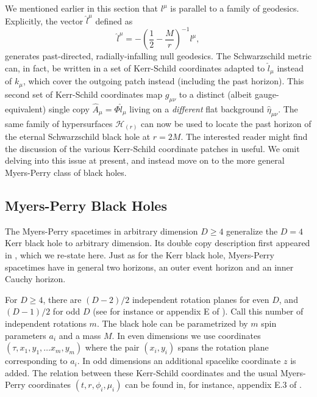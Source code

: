 We mentioned earlier in this section that $l^{\mu}$ is parallel to a family of geodesics. Explicitly, the vector
$\hat{l}^{\mu}$ defined as
\begin{equation}  
    \hat{l}^{\mu} = -\left( \frac{1}{2} - \frac{M}{r}\right)^{-1} l^{\mu},
\end{equation}
generates past-directed, radially-infalling null geodesics. The Schwarzschild metric can, in fact, be written in a
set of Kerr-Schild coordinates adapted to $\hat{l}_{\mu}$ instead of $k_{\mu}$, which cover the outgoing patch
instead (including the past horizon). This second set of Kerr-Schild coordinates map $g_{\mu \nu}$ to a distinct (albeit gauge-equivalent) single copy $\hat{A}_{\mu} = \Phi
\hat{l}_{\mu}$ living on a \emph{different} flat
background $\hat{\eta}_{\mu \nu}$. The same family of hypersurfaces $\mathcal{H}_{(r)}$ can now be used to locate
the past horizon of the eternal Schwarzschild black hole at $r = 2M$. The interested reader might find the
discussion of the various Kerr-Schild coordinate patches in \cite{Boyer:1966qh} useful. We omit delving into this
issue at present, and instead move on to the more general Myers-Perry class of black holes.

\subsection{Myers-Perry Black Holes}
The Myers-Perry spacetimes in arbitrary dimension $D \geq 4$ generalize the $D = 4$ Kerr black hole to arbitrary
dimension. Its double copy description first appeared in \cite{Monteiro:2014cda}, which we re-state here. Just as
for the Kerr black hole, Myers-Perry spacetimes have in general two horizons, an outer event horizon and an inner
Cauchy horizon. 

For $D \geq 4$, there are $(D-2) / 2$ independent rotation planes for even $D$, and
$(D-1)/2$ for odd $D$ (see for instance \cite{Myers:2011yc} or appendix E of \cite{Frolov:2017kze}). Call this number of independent rotations $m$. The black hole can be parametrized by
$m$ spin parameters $a_{i}$ and a mass $M$. In even dimensions we use coordinates $\left(\tau, x_{1}, y_{1}, \dots
x_{m}, y_{m}\right)$ where the pair $\left(x_{i}, y_{i}\right)$ spans the rotation plane corresponding to $a_{i}$.
In odd dimensions an additional spacelike coordinate $z$ is added. The relation between these Kerr-Schild
coordinates and the usual Myers-Perry coordinates $\left(t, r, \phi_{i}, \mu_{i}\right)$ can be found in, for
instance, appendix E.3 of \cite{Frolov:2017kze}.

